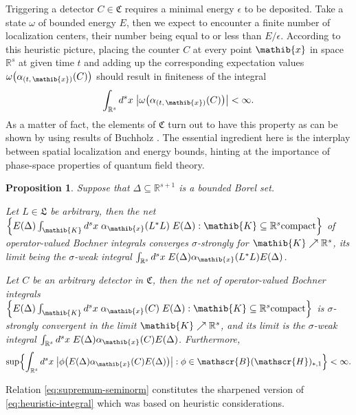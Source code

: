 \documentclass[a4paper,a4paper]{article}
\numberwithin{equation}{section}
\newcommand{\Cfrak}{\mathfrak{C}}
\newcommand{\Lfrak}{\mathfrak{L}}
\newcommand{\Kib}{\mathib{K}}
\newcommand{\xib}{\mathib{x}}
\newcommand{\Rs}{\mathbb{R}^s}
\newcommand{\Rsone}{\mathbb{R}^{s + 1}}
\newcommand{\BH}{\mathscr{B} ( \mathscr{H} )}
\newcommand{\ED}{E ( \Delta )}
\newcommand{\aibx}{\alpha_\mathib{x}}
\newcounter{propitem}
\newenvironment{proplist}{\begin{list}{(\roman{propitem})}%
  {\usecounter{propitem} \setlength{\topsep}{0ex}%
   \setlength{\parsep}{0.2ex} \setlength{\itemsep}{0.4ex}%
   \setlength{\leftmargin}{0em} \setlength{\itemindent}{0.5em}%
   }}{\end{list}}
\theoremstyle{definition}
\theoremstyle{plain}
\newtheorem{proposition}[definition]{Proposition}
\theoremstyle{remark}
\newcommand{\Bset}[1]{\Bigl\{ #1 \Bigr\}}
\newcommand{\babs}[1]{\bigl\lvert #1 \bigr\rvert}
\begin{document}
  Triggering a detector $C \in \Cfrak$ requires a minimal energy
  $\epsilon$ to be deposited. Take a state $\omega$ of bounded energy
  $E$, then we expect to encounter a finite number of localization
  centers, their number being equal to or less than
  $E/\epsilon$. According to this heuristic picture, placing the
  counter $C$ at every point $\xib$ in space $\Rs$ at given time $t$
  and adding up the corresponding expectation values $\omega \bigl(
  \alpha_{( t , \, \xib )} ( C ) \bigr)$ should result in finiteness
  of the integral 
  \begin{equation}
    \label{eq:heuristic-integral}
    \int_{\Rs} d^s x \; \babs{\omega \bigl( \alpha_{( t , \, \xib )} (
    C ) \bigr)} < \infty \text{.} 
  \end{equation}
  As a matter of fact, the elements of $\Cfrak$ turn out to have this
  property as can be shown by using results of Buchholz
  \cite{buchholz:1990}. The essential ingredient here is the interplay
  between spatial localization and energy bounds, hinting at the
  importance of phase-space properties of quantum field theory.
  \begin{proposition}
    \label{pro:counter-integrals}
    Suppose that $\Delta \subseteq \Rsone$ is a bounded Borel set.
    \begin{proplist}
    \item Let $L \in \Lfrak$ be arbitrary, then the net $\Bset{\ED
      \int_\Kib d^s x \; \aibx ( L^* L ) \; \ED : \Kib \subseteq \Rs
      \text{compact}}$ of operator-valued Bochner integrals
      converges $\sigma$-strongly for $\Kib \nearrow \Rs$, its limit
      being the $\sigma$-weak integral $\int_{\Rs} d^s x \; \ED \aibx
      ( L^* L ) \ED$.
    \item Let $C$ be an arbitrary detector in $\Cfrak$, then the net
      of operator-valued Bochner integrals $\Bset{\ED \int_\Kib d^s x
      \; \aibx ( C ) \; \ED : \Kib \subseteq \Rs \text{compact}}$ is
      $\sigma$-strongly convergent in the limit $\Kib \nearrow \Rs$,
      and its limit is the $\sigma$-weak integral $\int_{\Rs} d^s x \;
      \ED \aibx ( C ) \ED$. Furthermore,
      \begin{equation}
        \label{eq:supremum-seminorm}
        \sup \Bset{\int_{\Rs} d^s x \; \babs{\phi \bigl( \ED \aibx ( C
        ) \ED \bigr)} : \phi \in \BH_{*,1}} < \infty \text{.}
      \end{equation}
    \end{proplist}
  \end{proposition}
  Relation \eqref{eq:supremum-seminorm} constitutes the sharpened
  version of \eqref{eq:heuristic-integral} which was based on
  heuristic considerations.
  
\end{document}
